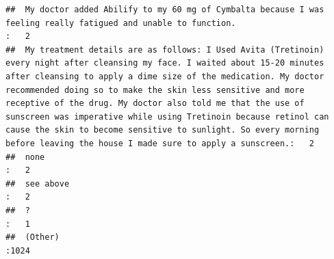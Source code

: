 \documentclass[spanish,]{article}
\begin{document}
\begin{verbatim}
##  My doctor added Abilify to my 60 mg of Cymbalta because I was feeling really fatigued and unable to function.                                                                                                                                                                                                                                                                                                                                                                                                               :   2  
##  My treatment details are as follows: I Used Avita (Tretinoin) every night after cleansing my face. I waited about 15-20 minutes after cleansing to apply a dime size of the medication. My doctor recommended doing so to make the skin less sensitive and more receptive of the drug. My doctor also told me that the use of sunscreen was imperative while using Tretinoin because retinol can cause the skin to become sensitive to sunlight. So every morning before leaving the house I made sure to apply a sunscreen.:   2  
##  none                                                                                                                                                                                                                                                                                                                                                                                                                                                                                                                        :   2  
##  see above                                                                                                                                                                                                                                                                                                                                                                                                                                                                                                                   :   2  
##  ?                                                                                                                                                                                                                                                                                                                                                                                                                                                                                                                           :   1  
##  (Other)                                                                                                                                                                                                                                                                                                                                                                                                                                                                                                                     :1024
\end{verbatim}
\end{document}
